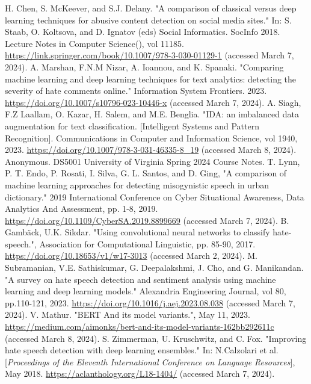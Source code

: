 \documentclass[conference]{IEEEtran}
\begin{document}
\begin{thebibliography}{00}
H. Chen, S. McKeever, and S.J. Delany. "A comparison of classical versus deep learning techniques for abusive content detection on social media sites." In: S. Staab, O. Koltsova, and D. Ignatov (eds) Social Informatics. SocInfo 2018. Lecture Notes in Computer Science(), vol 11185. \href{https://link.springer.com/book/10.1007/978-3-030-01129-1}{https://link.springer.com/book/10.1007/978-3-030-01129-1} (accessed March 7, 2024).
A. Marshan, F.N.M Nizar, A. Ioannou, and K. Spanaki. "Comparing machine learning and deep learning techniques for text analytics: detecting the severity of hate comments online." Information System Frontiers. 2023. \href{https://doi.org/10.1007/s10796-023-10446-x}{https://doi.org/10.1007/s10796-023-10446-x} (accessed March 7, 2024).
A. Siagh, F.Z Laallam, O. Kazar, H. Salem, and M.E. Benglia. "IDA: an imbalanced data augmentation for text classification. [Intelligent Systems and Pattern Recognition]. Communications in Computer and Information Science, vol 1940, 2023. \href{https://doi.org/10.1007/978-3-031-46335-8_19}{https://doi.org/10.1007/978-3-031-46335-8{\_}19} (accessed March 8, 2024).
 Anonymous. DS5001 University of Virginia Spring 2024 Course Notes. 
T. Lynn, P. T. Endo, P. Rosati, I. Silva, G. L. Santos, and D. Ging, "A comparison of machine learning approaches for detecting misogynistic speech in urban dictionary." 2019 International Conference on Cyber Situational Awareness, Data Analytics And Assessment, pp. 1-8, 2019. \href{https://doi.org/10.1109/CyberSA.2019.8899669}{https://doi.org/10.1109/CyberSA.2019.8899669} (accessed March 7, 2024).
B. Gambäck, U.K. Sikdar. "Using convolutional neural networks to classify hate-speech.", Association for Computational Linguistic, pp. 85-90, 2017. \href{https://doi.org/10.18653/v1/w17-3013} 
{https://doi.org/10.18653/v1/w17-3013} (accessed March 2, 2024).
M. Subramanian, V.E. Sathiskumar, G. Deepalakshmi, J. Cho, and G. Manikandan. "A survey on hate speech detection and sentiment analysis using machine learning and deep learning models." Alexandria Engineering Journal, vol 80, pp.110-121, 2023. \href{https://doi.org/10.1016/j.aej.2023.08.038}{https://doi.org/10.1016/j.aej.2023.08.038} (accessed March 7, 2024).
 V. Mathur. "BERT And its model variants.", May 11, 2023. \href{https://medium.com/aimonks/bert-and-its-model-variants-162bb292611c}{https://medium.com/aimonks/bert-and-its-model-variants-162bb292611c} (accessed March 8, 2024).
S. Zimmerman, U. Kruschwitz, and C. Fox. "Improving hate speech detection with deep learning ensembles." In: N.Calzolari et al. [\textit{Proceedings of the Eleventh International Conference on Language Resources}], May 2018. \href{https://aclanthology.org/L18-1404/}{https://aclanthology.org/L18-1404/} (accessed March 7, 2024).

\end{thebibliography}
\end{document}

